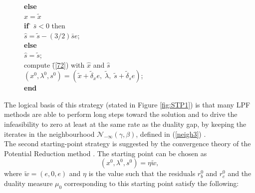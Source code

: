 \documentclass[a4paper,10 pt,titlepage,twoside]{report}
\theoremstyle{plain}
\theoremstyle{definition}
\theoremstyle{remark}
\begin{document}
{{\begin{figure}
{\begin{boxedminipage}{1\linewidth}
\begin{tabbing}
				\textbf{else} \=\\
				\> $\hat{x} = \tilde{x}$\\
				\textbf{if} \= $\bar{s}<0$ then\\
				\> $\hat{s}= \tilde{s} -(3/2)\bar{s}e$;\\
				\textbf{else} \=\\
				\> $\hat{s} = \tilde{s}$;\\
				compute \=(\ref{72}) with $\hat{x}$ and $\hat{s}$\\
				\>$(x^{0}, \lambda^{0}, s^{0}) = (\tilde{x}+\tilde{\delta}_{x} e,\;\tilde{\lambda},\;\tilde{s}+\tilde{\delta}_{s} e)$;\\
				\textbf{end}
			\end{tabbing}
		\end{boxedminipage}
		} \quad
\end{figure}
The logical basis of this strategy (stated in Figure \ref{fig:STP1}) is that many LPF methods are able to perform long steps toward the solution and to drive the infeasibility to zero at least at the same rate as the duality gap, by keeping the iterates in the neighbourhood $\mathcal{N}_{-\infty}(\gamma,\beta)$, defined in (\ref{neigh3}) \cite{SPS}.\\[1 cm]
The second starting-point strategy is suggested by the convergence theory of the Potential Reduction method \cite{SPS}. The starting point can be chosen as \begin{equation*}
(x^{0}, \lambda^{0}, s^{0}) = \eta \tilde{w},
\end{equation*}where $\tilde{w} = (e,0,e)$ and $\eta$ is the value such that the residuals $r_{b}^{0}$ and $r_{c}^{0}$ and the duality measure $\mu_{0}$ corresponding to this starting point satisfy the following:

}}
\end{document}
